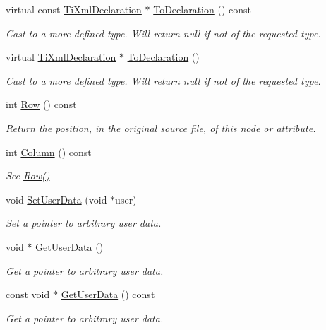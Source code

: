 \begin{DoxyCompactItemize}
virtual const \hyperlink{classTiXmlDeclaration}{TiXmlDeclaration} $\ast$ \hyperlink{classTiXmlNode_a9f43e6984fc7d4afd6eb32714c6b7b72}{ToDeclaration} () const 
\begin{DoxyCompactList}\small\item\em Cast to a more defined type. Will return null if not of the requested type. \item\end{DoxyCompactList}\item 
virtual \hyperlink{classTiXmlDeclaration}{TiXmlDeclaration} $\ast$ \hyperlink{classTiXmlNode_a4027136ca820ff4a636b607231b6a6df}{ToDeclaration} ()
\begin{DoxyCompactList}\small\item\em Cast to a more defined type. Will return null if not of the requested type. \item\end{DoxyCompactList}\item 
int \hyperlink{classTiXmlBase_a024bceb070188df92c2a8d8852dd0853}{Row} () const 
\begin{DoxyCompactList}\small\item\em Return the position, in the original source file, of this node or attribute. \item\end{DoxyCompactList}\item 
int \hyperlink{classTiXmlBase_ab54bfb9b70fe6dd276e7b279cab7f003}{Column} () const 
\begin{DoxyCompactList}\small\item\em See \hyperlink{classTiXmlBase_a024bceb070188df92c2a8d8852dd0853}{Row()} \item\end{DoxyCompactList}\item 
void \hyperlink{classTiXmlBase_ac6b3e0f790930d4970ec30764e937b5d}{SetUserData} (void $\ast$user)
\begin{DoxyCompactList}\small\item\em Set a pointer to arbitrary user data. \item\end{DoxyCompactList}\item 
void $\ast$ \hyperlink{classTiXmlBase_a6559a530ca6763fc301a14d77ed28c17}{GetUserData} ()
\begin{DoxyCompactList}\small\item\em Get a pointer to arbitrary user data. \item\end{DoxyCompactList}\item 
const void $\ast$ \hyperlink{classTiXmlBase_ad0120210e4680ef2088601753ce0ede4}{GetUserData} () const 
\begin{DoxyCompactList}\small\item\em Get a pointer to arbitrary user data. \item\end{DoxyCompactList}\end{DoxyCompactItemize}
